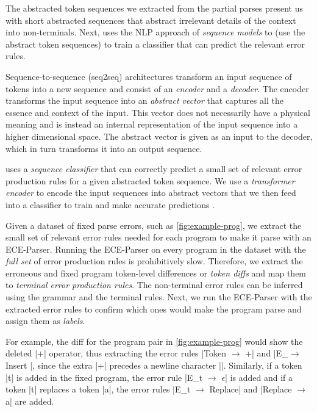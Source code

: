 The abstracted token sequences we extracted from
the partial parses present us with short abstracted
sequences that abstract irrelevant details of the context
into non-terminals.
%
Next, \toolname uses the NLP approach of \emph{sequence models}
\citep{Sutskever_2014, Hardalov_2018} to (use the abstract token sequences) to
train a classifier that can predict the relevant error rules.

%
Sequence-to-sequence (seq2seq) architectures
transform an input sequence of tokens into a
new sequence \citep{Sutskever_2014} and consist
of an \emph{encoder} and a \emph{decoder}.
%
The encoder transforms the input sequence into an \emph{abstract vector} that
captures all the essence and context of the input.
%
This vector does not necessarily have a physical
meaning and is instead an internal representation
of the input sequence into a higher dimensional space.
The abstract vector is given as an input to the decoder,
which in turn transforms it into an output sequence.


\toolname uses a \emph{sequence classifier} that can correctly predict a small
set of relevant error production rules for a given abstracted token sequence. We
use a \emph{transformer encoder} \citep{Vaswani_2017} to encode the input
sequences into abstract vectors that we then feed into a \emph{\dnn} classifier
to train and make accurate predictions \citep{Schmidhuber_2015}.

%
Given a dataset of fixed parse errors,
such as \autoref{fig:example-prog}, we
extract the small set of relevant error
rules needed for each program to make it parse
with an ECE-Parser.
%
Running the ECE-Parser on every program
in the dataset with the \emph{full set}
of error production rules is prohibitively
slow.
%
Therefore, we extract the erroneous and
fixed program token-level differences or
\emph{token diffs} and map them to
\emph{terminal error production rules}.
%
The non-terminal error rules can be
inferred using the grammar and the terminal
rules. Next, we run the ECE-Parser with
the extracted error rules to confirm which
ones would make the program parse and assign them as
\emph{labels}.

For example, the diff for the program pair in
\autoref{fig:example-prog} would show the
deleted |+| operator, thus extracting
the error rules |Token $\rightarrow$ +|
and |E_\n $\rightarrow$ Insert \n|,
since the extra |+| precedes
a newline character |\n|.
%
Similarly, if a token |t| is added in
the fixed program, the error rule
%
|E_t $\rightarrow$ $\epsilon$| is added and if a token |t| replaces a token |a|,
the error rules |E_t $\rightarrow$ Replace| and
%
|Replace $\rightarrow$ a| are added.

